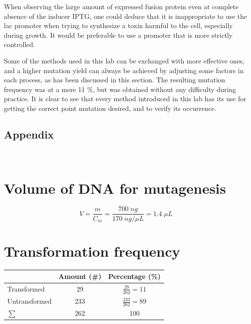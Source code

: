 \documentclass[11pt,a4paper]{article}
\begin{document}
When observing the large amount of expressed fusion protein even at complete absence of the inducer IPTG, one could deduce that it is inappropriate to use the lac promoter when trying to synthesize a toxin harmful to the cell, especially during growth. It would be preferable to use a promoter that is more strictly controlled.

Some of the methods used in this lab can be exchanged with more effective ones, and a higher mutation yield can always be achieved by adjusting some factors in each process, as has been discussed in this section. The resulting mutation frequency was at a mere 11 \%, but was obtained without any difficulty during practice. It is clear to see that every method introduced in this lab has its use for getting the correct point mutation desired, and to verify its occurrence.

\printbibliography[
heading=bibintoc,
title={References}
]

\pagebreak
\begin{center}

\section*{Appendix}\end{center}
\\
\appendix

 \section{Volume of DNA for mutagenesis}
$$V=\frac{m}{C_m}=\frac{700 \; ng}{170 \; ng/\mu L}=1.4 \; \mu L$$

 \section{Transformation frequency}
  \begin{table}[H]
\begin{center}
 \begin{tabular} {l|cc}
 & Amount (\#) & Percentage (\%) \\
 \hline
 Transformed & 29 & $\frac{29}{262}=11$ \\ 
 Untransformed & 233 & $\frac{233}{262}=89$ \\  
 \hline
 $\sum$ & 262 & 100
\end{tabular}
\end{center}
\end{table}
\end{document}
